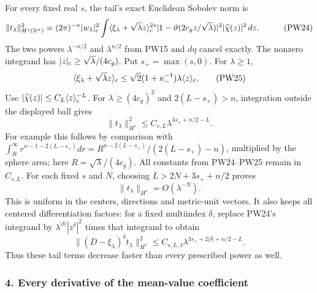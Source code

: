\documentclass[
  11pt,
]{article}
\makeatletter
\let\ReaderOriginalAnchorStart\hyper@anchorstart
\let\ReaderOriginalAnchorEnd\hyper@anchorend
\let\ReaderPendingAliases\@empty
\def\ReaderArmAliases#1{\gdef\ReaderPendingAliases{#1}}
\def\hyper@anchorstart#1{\ReaderIfNativeAnchorTF{#1}{\ReaderPendingAliases\global\let\ReaderPendingAliases\@empty}{}\ReaderOriginalAnchorStart{#1}}
\makeatother
\begin{document}
For every fixed real \(s\), the tail's exact Euclidean Sobolev norm is
\[
 \begin{split}
 \|t_\lambda\|_{H^s(\mathbb R^n)}^2
  &=(2\pi)^{-n}|w_\lambda|_{\rm c}^2
    \int \langle\xi_\lambda+\sqrt\lambda z\rangle_{\rm c}^{2s}
       |1-\vartheta(2c_g z/\sqrt\lambda)|^2
       |\widehat\chi(z)|^2\,dz .
 \end{split}
 \tag{PW24}
\] The two powers \(\lambda^{-n/2}\) and \(\lambda^{n/2}\) from PW15 and
\(d\eta\) cancel exactly. The nonzero integrand has
\(|z|_{\rm c}\geq\sqrt\lambda/(4c_g)\). Put \(s_+=\max(s,0)\). For
\(\lambda\geq1\), \[
 \langle\xi_\lambda+\sqrt\lambda z\rangle_{\rm c}
 \leq \sqrt2(1+\kappa_-^{-1})\lambda
                         \langle z\rangle_{\rm c}.
 \tag{PW25}
\] Use \(|\widehat\chi(z)|\leq C_L\langle z\rangle_{\rm c}^{-L}\). For
\(\lambda\geq(4c_g)^2\) and \(2(L-s_+)>n\), integration outside the
displayed ball gives \[
 \|t_\lambda\|_{H^s}^2
       \leq C_{s,L}\lambda^{3s_++n/2-L}.
 \tag{PW26}
\] For example this follows by comparison with
\(\int_R^\infty r^{n-1-2(L-s_+)}dr
 =R^{n-2(L-s_+)}/(2(L-s_+)-n)\), multiplied by the sphere area; here
\(R=\sqrt\lambda/(4c_g)\). All constants from PW24--PW25 remain in
\(C_{s,L}\). For each fixed \(s\) and \(N\), choosing \(L>2N+3s_++n/2\)
proves \[
 \|t_\lambda\|_{H^s}=O(\lambda^{-N}).
 \tag{PW27}
\] This is uniform in the centers, directions and metric-unit vectors.
It also keeps all centered differentiation factors: for a fixed
multiindex \(\delta\), replace PW24's integrand by
\(\lambda^{|\delta|}|z^\delta|^2\) times that integrand to obtain \[
 \|(D-\xi_\lambda)^\delta t_\lambda\|_{H^s}^2
       \leq C_{s,L,\delta}
           \lambda^{3s_++2|\delta|+n/2-L}.
 \tag{PW28}
\] Thus these tail terms decrease faster than every prescribed power as
well.

\ReaderArmAliases{\ReaderOriginalAnchorStart{4-every-derivative-of-the-mean-value-coefficient}\ReaderOriginalAnchorEnd\begingroup\expandafter\def\csname @currentHref\endcsname{4-every-derivative-of-the-mean-value-coefficient}\label{4-every-derivative-of-the-mean-value-coefficient}\endgroup}
\subsubsection{4. Every derivative of the mean-value
coefficient}\label{every-derivative-of-the-mean-value-coefficient}
\end{document}
